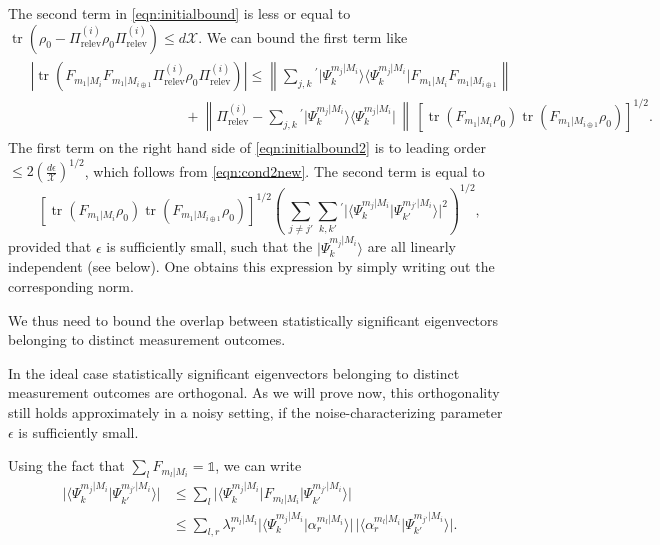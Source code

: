 The second term in \ref{eqn:initialbound} is less or equal to $\operatorname{tr}\left(\rho_0-\Pi_{\text{relev}}^{(i)}\rho_0\Pi_{\text{relev}}^{(i)}\right)\leq d\mathcal{X}$. We can bound the first term like
\begin{align}
\label{eqn:initialbound2}
\begin{split}
& \left| \operatorname{tr}\left(F_{m_1\vert M_i} F_{m_1\vert M_{i \oplus 1}}\Pi_{\text{relev}}^{(i)}\rho_0\Pi_{\text{relev}}^{(i)}\right)\right| \leq  \left\|\sum_{j,k} {}^{'} \vert \Psi_k^{m_j\vert M_i}\rangle \langle \Psi_k^{m_j\vert M_i} \vert F_{m_1\vert M_i} F_{m_1 \vert M_{i\oplus 1}}\right\| \\
& \hspace{11em} + \left\|\Pi_{\text{relev}}^{(i)} - \sum_{j,k} {}^{'} \vert \Psi_k^{m_j\vert M_i}\rangle \langle \Psi_k^{m_j\vert M_i} \vert \, \right\| \,\left[ \operatorname{tr}(F_{m_1\vert M_i}\rho_0)\operatorname{tr}(F_{m_1\vert M_{i\oplus 1}}\rho_0)\right]^{1/2}.
\end{split}
\end{align}
The first term on the right hand side of \ref{eqn:initialbound2} is to leading order $\leq 2\left(\frac{d\epsilon}{\mathcal{X}}\right)^{1/2}$, which follows from \ref{eqn:cond2new}. The second term is equal to
\begin{equation}
\label{eqn:tobound}
\left[\operatorname{tr}(F_{m_1\vert M_i}\rho_0)\operatorname{tr}(F_{m_1\vert M_{i\oplus 1}}\rho_0)\right]^{1/2}\left(\,\sum_{j\neq j'}\sum_{k,k'}{}^{'}\vert \langle \Psi_k^{m_j\vert M_i}\vert \Psi_{k'}^{m_{j'}\vert M_i} \rangle \vert^2\right)^{1/2},
\end{equation}
provided that $\epsilon$ is sufficiently small, such that the $\vert \Psi_k^{m_j \vert M_i}\rangle$ are all linearly independent (see below). One obtains this expression by simply writing out the corresponding norm.

We thus need to bound the overlap between statistically significant eigenvectors belonging to distinct measurement outcomes.

In the ideal case statistically significant eigenvectors belonging to distinct measurement outcomes are orthogonal. As we will prove now, this orthogonality still holds approximately in a noisy setting, if the noise-characterizing parameter $\epsilon$ is sufficiently small.

Using the fact that $\sum_{l} F_{m_{l}\vert M_i}=\mathbb{1}$, we can write
\begin{align}
\vert\langle \Psi_k^{m_j\vert M_i} \vert \Psi_{k'}^{m_{j'}\vert M_i}\rangle \vert & \leq \sum_l \vert \langle \Psi_k^{m_j\vert M_i} \vert F_{m_l\vert M_i}\vert \Psi_{k'}^{m_{j'}\vert M_i}\rangle\vert \\
\label{eqn:toinsert}
& \leq \sum_{l,r}\lambda_r^{m_l\vert M_i}\vert \langle \Psi_k^{m_j\vert M_i} \vert \alpha_r^{m_l\vert M_i}\rangle \vert \, \vert \langle \alpha_r^{m_l\vert M_i}\vert \Psi_{k'}^{m_{j'}\vert M_i}\rangle \vert.
\end{align}

